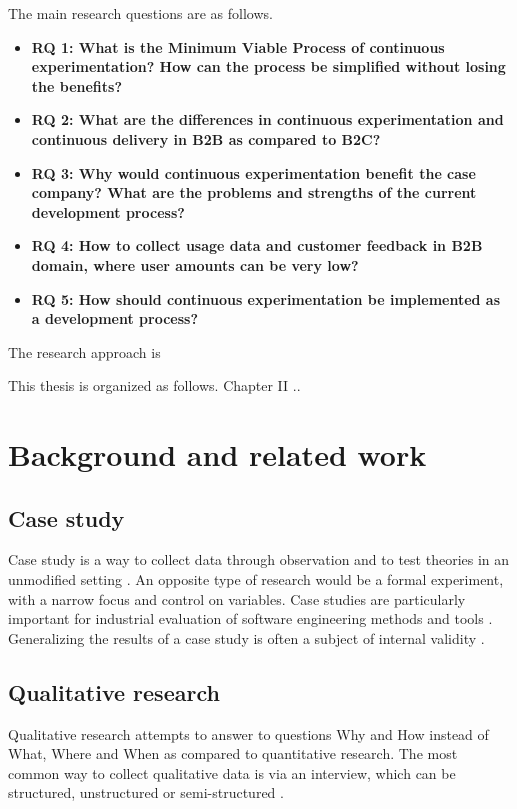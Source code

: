 \documentclass[english]{tktltiki2}
\theoremstyle{definition}
\theoremstyle{remark}
\begin{document}
The main research questions are as follows.
\begin{itemize}
\item  \textbf{RQ 1: What is the Minimum Viable Process of continuous experimentation? How can the process be simplified without losing the benefits?}
\item  \textbf{RQ 2: What are the differences in continuous experimentation and continuous delivery in B2B as compared to B2C?}
\item  \textbf{RQ 3: Why would continuous experimentation benefit the case company? What are the problems and strengths of the current development process?}
\item  \textbf{RQ 4: How to collect usage data and customer feedback in B2B domain, where user amounts can be very low?}
\item  \textbf{RQ 5: How should continuous experimentation be implemented as a development process?}
\end{itemize}

The research approach is %

This thesis is organized as follows. Chapter II ..
%

\section{Background and related work}

\subsection{Case study}
Case study is a way to collect data through observation and to test theories in an unmodified setting \cite{zelkowitz1998experimental}. An opposite type of research would be a formal experiment, with a narrow focus and control on variables. Case studies are particularly important for industrial evaluation of software engineering methods and tools \cite{kitchenham1995case}. Generalizing the results of a case study is often a subject of internal validity \cite{TODO}. 

\subsection{Qualitative research}
Qualitative research attempts to answer to questions Why and How instead of What, Where and When as compared to quantitative research. The most common way to collect qualitative data is via an interview, which can be structured, unstructured or semi-structured \cite{Qualitative Methods in Empirical Studies of Software Engineering}. 
\end{document}
